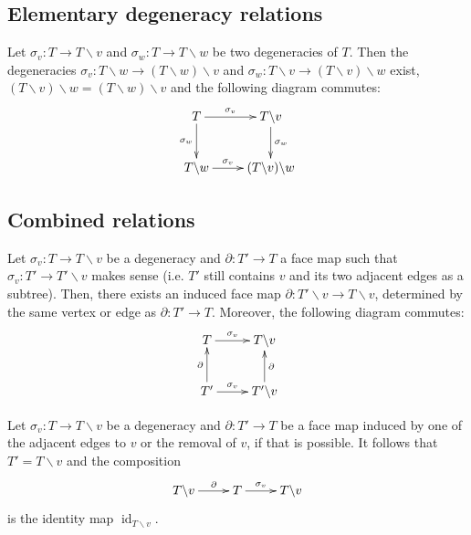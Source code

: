 \documentclass[a4paper]{amsart}
\theoremstyle{plain}
\theoremstyle{definition}
\theoremstyle{remark}
\DeclareMathOperator{\id}{id}
\newcommand{\To}{\longrightarrow}
\numberwithin{equation}{section}
\numberwithin{figure}{section}
\begin{document}
\subsection{Elementary degeneracy relations}
\label{degdeg}
Let $\sigma_v:T \To T\backslash v$ and $\sigma_w:T\To T\backslash w$ be two degeneracies of $T$. Then the degeneracies
$\sigma_v:T\backslash w\To (T\backslash w)\backslash v$ and $\sigma_w:T\backslash v\To (T\backslash v)\backslash w$ exist,
$(T\backslash v)\backslash w = (T\backslash w)\backslash v$ and the following diagram commutes:
$$\xymatrix{T\ar[r]^-{\sigma_v}\ar[d]_-{\sigma_w} & T\backslash v\ar[d]^-{\sigma_w}\\
    T\backslash w\ar[r]^-{\sigma_v} & (T\backslash v)\backslash w}$$

\subsection{Combined relations}
Let $\sigma_v:T\To T\backslash v$ be a degeneracy and $\partial:T'\To T$ a face map such that
$\sigma_v:T'\To T'\backslash v$ makes sense (i.e. $T'$ still contains $v$ and its two adjacent edges as a subtree). Then,
there exists an induced face map $\partial:T'\backslash v\To T\backslash v$, determined by the same vertex or edge as
$\partial:T'\To T$. Moreover, the following diagram commutes:
\begin{equation}
    \xymatrix{T\ar[r]^-{\sigma_v}&T\backslash v\\
    T'\ar[u]^-{\partial}\ar[r]^-{\sigma_v} &T'\backslash v\ar[u]_-{\partial}}
    \label{combrel01}
\end{equation}

Let $\sigma_v:T\To T\backslash v$ be a degeneracy and $\partial:T'\To T$ be a face map induced by one of the
adjacent edges to $v$ or the removal of $v$, if that is possible. It follows that $T'=T\backslash v$ and the composition
\begin{equation}
    \xymatrix{ T\backslash v\ar[r]^-\partial &T\ar[r]^-{\sigma_v} &T\backslash v}
    \label{combrel02}
\end{equation}
is the identity map $\id_{T\backslash v}$.
\end{document}
